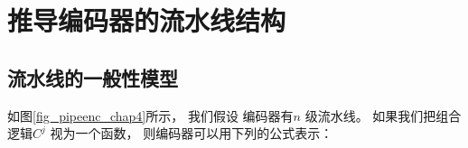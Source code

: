%
%
%
%
%
%
%
%
%
%


\section{推导编码器的流水线结构}\label{sec_pipeinfer_chap4}

\subsection{流水线的一般性模型}
如图\ref{fig_pipeenc_chap4}所示，
我们假设
编码器有$n$ 级流水线。
如果我们把组合逻辑$C^j$ 视为一个函数，
则编码器可以用下列的公式表示：

